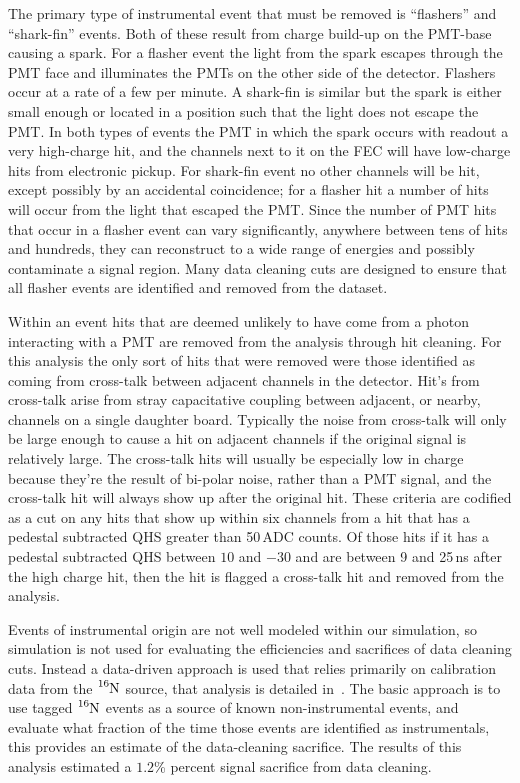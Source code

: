 The primary type of instrumental event that must be removed is ``flashers'' and
``shark-fin'' events.
Both of these result from charge build-up on the PMT-base causing a
spark.
For a flasher event the light from the spark escapes through the PMT face
and illuminates the PMTs on the other side of the detector.
Flashers occur at a rate of a few per minute.
A shark-fin is similar but the spark is either small enough or located
in a position such that the light does not escape the PMT.\@
In both types of events the PMT in which the spark occurs with readout
a very high-charge hit, and the channels next to it on the FEC will
have low-charge hits from electronic pickup.
For shark-fin event no other channels will be hit, except possibly by an
accidental coincidence; for a flasher hit a number of hits will
occur from the light that escaped the PMT.\@
Since the number of PMT hits that occur in a flasher event can vary significantly,
anywhere between tens of hits and hundreds, they can reconstruct
to a wide range of energies and possibly contaminate a signal region.
Many data cleaning cuts are designed to ensure that all
flasher events are identified and removed from the dataset.

Within an event hits that are deemed unlikely to have come from a photon interacting with a PMT
are removed from the analysis through hit cleaning.
For this analysis the only sort of hits that were removed were those identified
as coming from cross-talk between adjacent channels in the detector.
Hit's from cross-talk arise from stray capacitative coupling between adjacent, or nearby, channels
on a single daughter board.
Typically the noise from cross-talk will only be large enough to cause a hit
on adjacent channels if the original signal is relatively large.
The cross-talk hits will usually be especially low in charge because they're
the result of bi-polar noise, rather than a PMT signal, and the cross-talk
hit will always show up after the original hit.
These criteria are codified as a cut on any hits that show up within
 six channels from a hit that has a pedestal subtracted QHS greater
than 50\,ADC counts. Of those hits if it has a pedestal subtracted QHS between
$10$ and $-30$ and are between 9 and 25\,ns after the high charge hit,
then the hit is flagged a cross-talk hit and removed from the analysis.

Events of instrumental origin are not well modeled within our simulation,
so simulation is not used for evaluating the efficiencies and sacrifices of
data cleaning cuts.
Instead a data-driven approach is used that relies primarily on calibration
data from the $\ce{^{16}N}$ source, that analysis is detailed in~\citep{dc_document}.%
The basic approach is to use tagged $\ce{^{16}N}$ events as a source of known
non-instrumental events, and evaluate what fraction of the time those events
are identified as instrumentals, this provides an estimate of the data-cleaning
sacrifice. The results of this analysis estimated a $1.2$\% percent signal
sacrifice from data cleaning.

